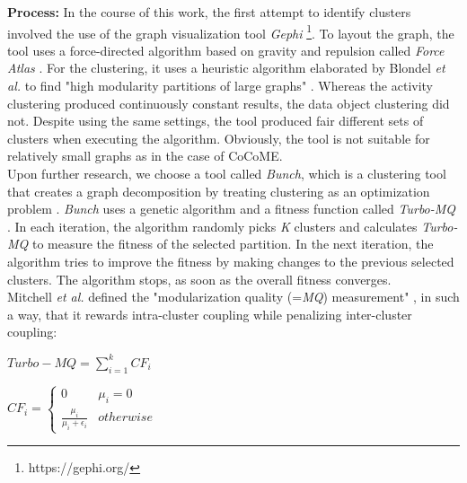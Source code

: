 \noindent
\textbf{Process:} In the course of this work, the first attempt to identify clusters involved the use of the graph visualization tool \textit{Gephi} \footnote{https://gephi.org/}. To layout the graph, the tool uses a force-directed algorithm based on gravity and repulsion called \textit{Force Atlas} \cite{gephi}. For the clustering, it uses a heuristic algorithm elaborated by Blondel \textit{et al.} to find "high modularity partitions of large graphs" \cite{modularity}. Whereas the activity clustering produced continuously constant results, the data object clustering did not. Despite using the same settings, the tool produced fair different sets of clusters when executing the algorithm. Obviously, the tool is not suitable for relatively small graphs as in the case of CoCoME.  \\
Upon further research, we choose a tool called \textit{Bunch}, which is a clustering tool that creates a graph decomposition by treating clustering as an optimization problem \cite{bunch}. \textit{Bunch} uses a genetic algorithm and a fitness function called \textit{Turbo-MQ} \cite{turbo-MQ}. In each iteration, the algorithm randomly picks \textit{K} clusters and calculates \textit{Turbo-MQ} to measure the fitness of the selected partition. In the next iteration, the algorithm tries to improve the fitness by making changes to the previous selected clusters. The algorithm stops, as soon as the overall fitness converges.\\



\noindent
Mitchell \textit{et al.} defined the "modularization quality (=\textit{MQ}) measurement" \cite{turbo-MQ}, in such a way, that it rewards intra-cluster coupling while penalizing inter-cluster coupling:

\vspace{1cm}
\noindent
\begin{minipage}{.4\linewidth}
	
	\flushleft
	\begin{math}
	  Turbo-MQ = \sum_{i=1}^{k} CF_{i} 
	\end{math}
	

\end{minipage}%
\begin{minipage}{.5\linewidth}
	\flushleft
	\begin{math}
      CF_{i} = \begin{cases}
       0 & \mu_{i} = 0 \\
        \frac{\mu_{i}}{\mu_{i} + \epsilon_{i}}  & otherwise
      \end{cases}
  \end{math}


\end{minipage}
\vspace{1cm}

